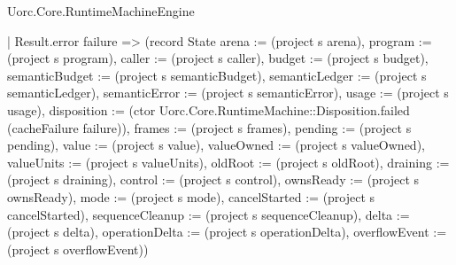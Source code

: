 \begin{lexlean}{Uorc.Core.RuntimeMachineEngine}
\begin{semanticmodule}
{            | Result.error failure => (record State {arena := (project s arena), program := (project s program), caller := (project s caller), budget := (project s budget), semanticBudget := (project s semanticBudget), semanticLedger := (project s semanticLedger), semanticError := (project s semanticError), usage := (project s usage), disposition := (ctor Uorc.Core.RuntimeMachine::Disposition.failed (cacheFailure failure)), frames := (project s frames), pending := (project s pending), value := (project s value), valueOwned := (project s valueOwned), valueUnits := (project s valueUnits), oldRoot := (project s oldRoot), draining := (project s draining), control := (project s control), ownsReady := (project s ownsReady), mode := (project s mode), cancelStarted := (project s cancelStarted), sequenceCleanup := (project s sequenceCleanup), delta := (project s delta), operationDelta := (project s operationDelta), overflowEvent := (project s overflowEvent)})
}
\end{semanticmodule}
\end{lexlean}
